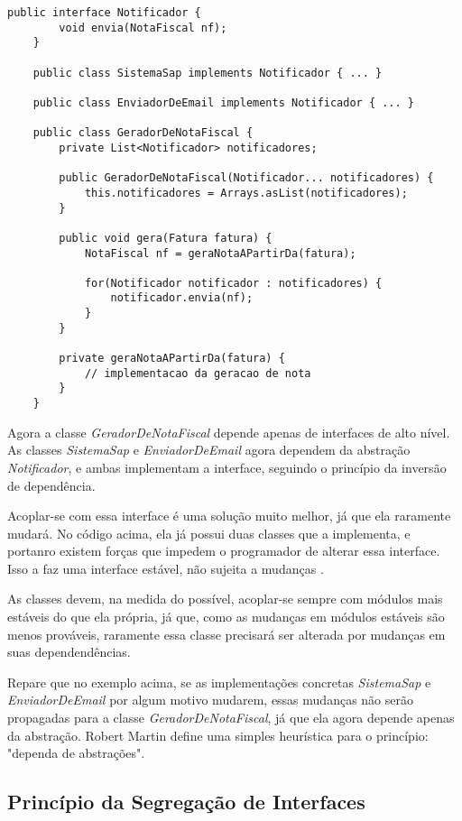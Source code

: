 \begin{lstlisting}[frame=trbl]
	public interface Notificador {
		void envia(NotaFiscal nf);
	}
	
	public class SistemaSap implements Notificador { ... }
	
	public class EnviadorDeEmail implements Notificador { ... }
	
	public class GeradorDeNotaFiscal {
		private List<Notificador> notificadores;
		
		public GeradorDeNotaFiscal(Notificador... notificadores) {
			this.notificadores = Arrays.asList(notificadores);
		}
		
		public void gera(Fatura fatura) {
			NotaFiscal nf = geraNotaAPartirDa(fatura);
			
			for(Notificador notificador : notificadores) {
				notificador.envia(nf);
			}
		}
		
		private geraNotaAPartirDa(fatura) {
			// implementacao da geracao de nota
		}
	}
\end{lstlisting}

Agora a classe \textit{GeradorDeNotaFiscal} depende apenas de interfaces de alto
nível. As classes \textit{SistemaSap} e \textit{EnviadorDeEmail} agora dependem
da abstração \textit{Notificador}, e ambas implementam a interface, seguindo o
princípio da inversão de dependência. 

Acoplar-se com essa interface é uma solução muito melhor, já que ela raramente
mudará. No código acima, ela já possui duas classes que a implementa, e portanro
existem forças que impedem o programador de alterar essa interface. Isso a
faz uma interface estável, não sujeita a mudanças \cite{bobmartin-oodmetrics}. 

As classes devem, na medida do possível, acoplar-se sempre com módulos mais
estáveis do que ela própria, já que, como as mudanças em módulos estáveis são
menos prováveis, raramente essa classe precisará ser alterada por mudanças em
suas dependendências.

Repare que no exemplo acima, se as implementações concretas \textit{SistemaSap}
e \textit{EnviadorDeEmail} por algum motivo mudarem, essas mudanças não serão
propagadas para a classe \textit{GeradorDeNotaFiscal}, já que ela agora depende
apenas da abstração. Robert Martin define uma simples heurística para o
princípio: "dependa de abstrações".

\subsection{Princípio da Segregação de Interfaces}
\label{subsec:isp}

